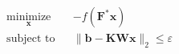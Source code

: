 \documentclass[border=2pt,varwidth]{standalone}
\begin{document}
\[
\begin{aligned}
& \underset{\mathbf{x}}{\text{minimize}}
& & -f(\mathbf{F}^* \mathbf{x}) \\
& \text{subject to}
& & \| \mathbf{b} - \mathbf{K} \mathbf{W} \mathbf{x} \|_2 \le \varepsilon
\end{aligned}
\]
\end{document}
